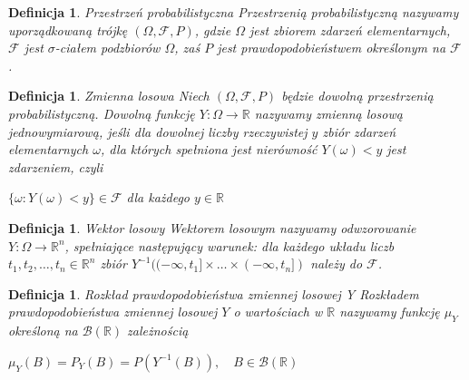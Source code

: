 \documentclass[12pt,a4paper]{report}
\newtheorem{definition}[theorem]{Definicja}
\begin{document}
\begin{definition}{Przestrzeń probabilistyczna \cite[w oparciu o rozdział 1.2]{krysicki1999}}
Przestrzenią probabilistyczną nazywamy uporządkowaną trójkę $(\Omega, \mathcal{F}, P)$, gdzie $\Omega$ jest zbiorem zdarzeń elementarnych, $\mathcal{F}$ jest $\sigma$-ciałem podzbiorów $\Omega$, zaś $P$ jest prawdopodobieństwem określonym na $\mathcal{F}$.
\end{definition}





\begin{definition}{Zmienna losowa \cite[Rozdział 2.1]{krysicki1999}}
Niech $(\Omega, \mathcal{F}, P)$ będzie dowolną przestrzenią probabilistyczną. Dowolną funkcję $\textit{Y} : \Omega \rightarrow \mathbb{R}$ nazywamy zmienną losową jednowymiarową, jeśli dla dowolnej liczby rzeczywistej $y$ zbiór zdarzeń elementarnych $\omega$, dla których spełniona jest nierówność $Y(\omega)< y$ jest zdarzeniem, czyli 

$\{\omega: Y(\omega) < y \} \in \mathcal{F}$ dla każdego $y \in \mathbb{R}$

\end{definition}


\begin{definition}{Wektor losowy \cite[Rozdział 5.1]{jakubowski2004}}
Wektorem losowym nazywamy odwzorowanie $Y:\Omega \rightarrow \mathbb{R}^n$, spełniające następujący warunek: dla każdego układu liczb $t_1,t_2,\ldots,t_n \in \mathbb{R}^n$ zbiór $Y^{-1}((-\infty,t_1]\times \ldots \times(-\infty,t_n])$ należy do $\mathcal{F}$.
\end{definition}


\begin{definition}{Rozkład prawdopodobieństwa zmiennej losowej Y \cite[Rozdział 5.1]{jakubowski2004}}
Rozkładem prawdopodobieństwa zmiennej losowej $Y$ o wartościach w $\mathbb{R}$ nazywamy funkcję $\mu_Y$ określoną na $\mathcal{B}(\mathbb{R})$ zależnością

$\mu_Y(B)=P_Y(B)=P(Y^{-1}(B)), \quad B \in \mathcal{B}(\mathbb{R})$
 
\end{definition}
\end{document}
